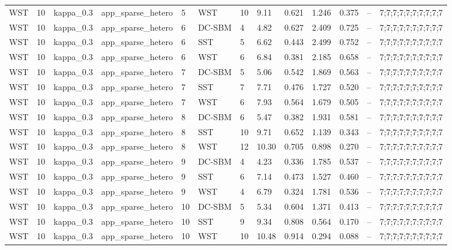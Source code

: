 \begin{table}[!h]
\begin{tabular}[t]{lllllllllllll}
WST & 10 & kappa_0.3 & app_sparse_hetero & 5 & WST & 10 & 9.11 & 0.621 & 1.246 & 0.375 & -- & 7;7;7;7;7;7;7;7;7;7\\
WST & 10 & kappa_0.3 & app_sparse_hetero & 6 & DC-SBM & 4 & 4.82 & 0.627 & 2.409 & 0.725 & -- & 7;7;7;7;7;7;7;7;7;7\\
WST & 10 & kappa_0.3 & app_sparse_hetero & 6 & SST & 5 & 6.62 & 0.443 & 2.499 & 0.752 & -- & 7;7;7;7;7;7;7;7;7;7\\
WST & 10 & kappa_0.3 & app_sparse_hetero & 6 & WST & 6 & 6.84 & 0.381 & 2.185 & 0.658 & -- & 7;7;7;7;7;7;7;7;7;7\\
WST & 10 & kappa_0.3 & app_sparse_hetero & 7 & DC-SBM & 5 & 5.06 & 0.542 & 1.869 & 0.563 & -- & 7;7;7;7;7;7;7;7;7;7\\
WST & 10 & kappa_0.3 & app_sparse_hetero & 7 & SST & 7 & 7.71 & 0.476 & 1.727 & 0.520 & -- & 7;7;7;7;7;7;7;7;7;7\\
WST & 10 & kappa_0.3 & app_sparse_hetero & 7 & WST & 6 & 7.93 & 0.564 & 1.679 & 0.505 & -- & 7;7;7;7;7;7;7;7;7;7\\
WST & 10 & kappa_0.3 & app_sparse_hetero & 8 & DC-SBM & 6 & 5.47 & 0.382 & 1.931 & 0.581 & -- & 7;7;7;7;7;7;7;7;7;7\\
WST & 10 & kappa_0.3 & app_sparse_hetero & 8 & SST & 10 & 9.71 & 0.652 & 1.139 & 0.343 & -- & 7;7;7;7;7;7;7;7;7;7\\
WST & 10 & kappa_0.3 & app_sparse_hetero & 8 & WST & 12 & 10.30 & 0.705 & 0.898 & 0.270 & -- & 7;7;7;7;7;7;7;7;7;7\\
WST & 10 & kappa_0.3 & app_sparse_hetero & 9 & DC-SBM & 4 & 4.23 & 0.336 & 1.785 & 0.537 & -- & 7;7;7;7;7;7;7;7;7;7\\
WST & 10 & kappa_0.3 & app_sparse_hetero & 9 & SST & 6 & 7.14 & 0.473 & 1.527 & 0.460 & -- & 7;7;7;7;7;7;7;7;7;7\\
WST & 10 & kappa_0.3 & app_sparse_hetero & 9 & WST & 4 & 6.79 & 0.324 & 1.781 & 0.536 & -- & 7;7;7;7;7;7;7;7;7;7\\
WST & 10 & kappa_0.3 & app_sparse_hetero & 10 & DC-SBM & 5 & 5.34 & 0.604 & 1.371 & 0.413 & -- & 7;7;7;7;7;7;7;7;7;7\\
WST & 10 & kappa_0.3 & app_sparse_hetero & 10 & SST & 9 & 9.34 & 0.808 & 0.564 & 0.170 & -- & 7;7;7;7;7;7;7;7;7;7\\
WST & 10 & kappa_0.3 & app_sparse_hetero & 10 & WST & 10 & 10.48 & 0.914 & 0.294 & 0.088 & -- & 7;7;7;7;7;7;7;7;7;7\\
\bottomrule
\end{tabular}
\end{table}
